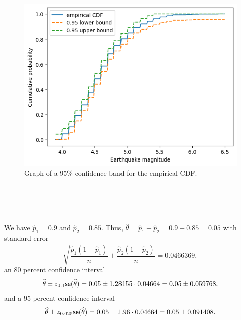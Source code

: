 \begin{ex}~
  \inputminted{python}{../code/07-07.py}
  \begin{figure}[H]
    \centering
    \includegraphics[scale=1.1]{../images/07-07}
    \caption{Graph of a 95\% confidence band for the empirical CDF.}
  \end{figure}
  \inputminted{text}{../output/07-07.txt}
\end{ex}

\begin{ex}~
  \inputminted{python}{../code/07-08.py}
  \inputminted{text}{../output/07-08.txt}
\end{ex}

\begin{ex}
  We have $\widehat{p}_1=0.9$ and $\widehat{p}_2=0.85$. Thus,
  $\widehat{\theta}=\widehat{p}_1-\widehat{p}_2=0.9-0.85=0.05$ with standard
  error
  \[
    \sqrt{\frac{\widehat{p}_1(1-\widehat{p}_1)}{n}
      +\frac{\widehat{p}_2(1-\widehat{p}_2)}{n}}
    =0.0466369,
  \]
  an 80 percent confidence interval
  \[
    \widehat{\theta}\pm z_{0.1}\textsf{se}(\widehat{\theta})
    =0.05\pm 1.28155\cdot 0.04664
    =0.05\pm 0.059768,
  \]
  and a 95 percent confidence interval
  \[
    \widehat{\theta}\pm z_{0.025}\textsf{se}(\widehat{\theta})
    =0.05\pm 1.96\cdot 0.04664
    =0.05\pm 0.091408.
  \]
\end{ex}

\begin{ex}~
  \inputminted{python}{../code/07-10.py}
  \inputminted{text}{../output/07-10.txt}
\end{ex}
